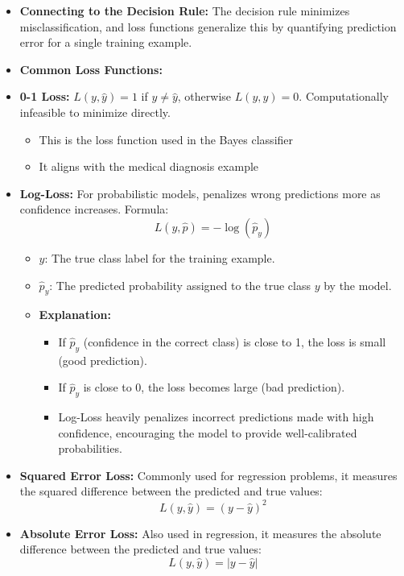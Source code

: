 \documentclass[12pt]{article}
\begin{document}
\begin{itemize}
    \item \textbf{Connecting to the Decision Rule:} The decision rule minimizes misclassification, and loss functions generalize this by quantifying prediction error for a single training example.
    \item \textbf{Common Loss Functions:}
    \item \textbf{0-1 Loss:} $L(y, \hat{y}) = 1$ if $y \neq \hat{y}$, otherwise $L(y, \hat{y}) = 0$. Computationally infeasible to minimize directly.
    \begin{itemize}
        \item This is the loss function used in the Bayes classifier
        \item It aligns with the medical diagnosis example
    \end{itemize}
    \item \textbf{Log-Loss:} For probabilistic models, penalizes wrong predictions more as confidence increases. Formula:
    \[
    L(y, \hat{p}) = -\log(\hat{p}_y)
    \]
    \begin{itemize}
        \item \( y \): The true class label for the training example.
        \item \( \hat{p}_y \): The predicted probability assigned to the true class \( y \) by the model.
        \item \textbf{Explanation:}
        \begin{itemize}
            \item If \( \hat{p}_y \) (confidence in the correct class) is close to 1, the loss is small (good prediction).
            \item If \( \hat{p}_y \) is close to 0, the loss becomes large (bad prediction).
            \item Log-Loss heavily penalizes incorrect predictions made with high confidence, encouraging the model to provide well-calibrated probabilities.
        \end{itemize}
    \end{itemize}
    \item \textbf{Squared Error Loss:} Commonly used for regression problems, it measures the squared difference between the predicted and true values:
    \[
    L(y, \hat{y}) = (y - \hat{y})^2
    \]

    \item \textbf{Absolute Error Loss:} Also used in regression, it measures the absolute difference between the predicted and true values:
    \[
    L(y, \hat{y}) = |y - \hat{y}|
    \]
\end{itemize}
\end{document}
